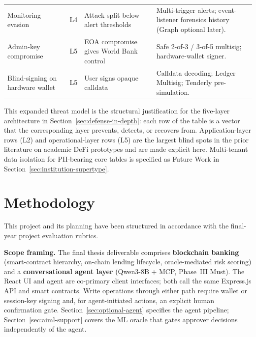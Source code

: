 \documentclass[12pt,a4paper]{report}
\begin{document}
\begin{table}[H]
\begin{tabular}{@{}p{2.3cm}p{1.1cm}p{3.6cm}p{5.8cm}@{}}
\rowcolor{RowShade}
Monitoring evasion & L4 & Attack split below alert thresholds & Multi-trigger alerts; event-listener forensics history (Graph optional later). \\
Admin-key compromise & L5 & EOA compromise gives World Bank control & Safe 2-of-3 / 3-of-5 multisig; hardware-wallet signer. \\
\rowcolor{RowShade}
Blind-signing on hardware wallet & L5 & User signs opaque calldata & Calldata decoding; Ledger Multisig; Tenderly pre-simulation. \\
\bottomrule
\end{tabular}
\end{table}

This expanded threat model is the structural justification for the five-layer architecture in Section~\ref{sec:defense-in-depth}: each row of the table is a vector that the corresponding layer prevents, detects, or recovers from. Application-layer rows (L2) and operational-layer rows (L5) are the largest blind spots in the prior literature on academic DeFi prototypes and are made explicit here. Multi-tenant data isolation for PII-bearing core tables is specified as Future Work in Section~\ref{sec:institution-supertype}.

\chapter{Methodology}

This project and its planning have been structured in accordance with the final-year project evaluation rubrics.

\noindent\textbf{Scope framing.} The final thesis deliverable comprises \textbf{blockchain banking} (smart-contract hierarchy, on-chain lending lifecycle, oracle-mediated risk scoring) and a \textbf{conversational agent layer} (Qwen3-8B + MCP, Phase~III Must). The React UI and agent are co-primary client interfaces; both call the same Express.js API and smart contracts. Write operations through either path require wallet or session-key signing and, for agent-initiated actions, an explicit human confirmation gate. Section~\ref{sec:optional-agent} specifies the agent pipeline; Section~\ref{sec:aiml-support} covers the ML oracle that gates approver decisions independently of the agent.
\end{document}
